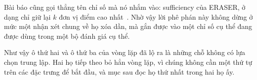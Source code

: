 Bài báo cũng gọi thẳng tên chỉ số mà nó nhắm vào: sufficiency của ERASER, ở
dạng chỉ giữ lại $k$ đơn vị điểm cao nhất~\autocite{mood}. Nhờ vậy lời phê phán
này không dừng ở mức một nhận xét chung về họ xóa dần, mà gắn được vào một chỉ
số cụ thể đang được dùng trong một bộ đánh giá cụ thể.

Như vậy ô thứ hai và ô thứ ba của vòng lặp đã lộ ra là những chỗ không có lựa
chọn trung lập. Hai họ tiếp theo bỏ hẳn vòng lặp, vì chúng không cần một thứ tự
trên các đặc trưng để bắt đầu, và mục sau đọc họ thứ nhất trong hai họ ấy.
